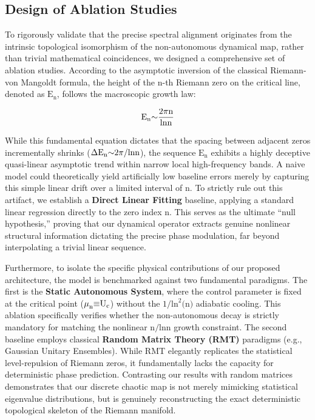 \documentclass[fleqn,10pt]{wlscirep}
\begin{document}
\subsection*{Design of Ablation Studies}

To rigorously validate that the precise spectral alignment originates
from the intrinsic topological isomorphism of the non-autonomous
dynamical map, rather than trivial mathematical coincidences, we
designed a comprehensive set of ablation studies. According to the
asymptotic inversion of the classical Riemann-von Mangoldt formula, the
height of the \(\text{n}\)-th Riemann zero on the critical line, denoted
as \(\text{E}_{\text{n}}\), follows the macroscopic growth law:

\[\text{E}_{\text{n}}\text{\ensuremath{\sim}}\frac{\text{2}\text{\ensuremath{\pi}n}}{\text{ln}\text{n}}\]

While this fundamental equation dictates that the spacing between
adjacent zeros incrementally shrinks
(\(\text{\ensuremath{\Delta}}\text{E}_{\text{n}}\text{\ensuremath{\sim}2}\text{\ensuremath{\pi}}\text{/ln}\text{n}\)),
the sequence \(\text{E}_{\text{n}}\) exhibits a highly deceptive
quasi-linear asymptotic trend within narrow local high-frequency bands.
A naive model could theoretically yield artificially low baseline errors
merely by capturing this simple linear drift over a limited interval of
\(\text{n}\). To strictly rule out this artifact, we establish a
\textbf{Direct Linear Fitting} baseline, applying a standard linear
regression directly to the zero index \(\text{n}\). This serves as the
ultimate ``null hypothesis,'' proving that our dynamical operator
extracts genuine nonlinear structural information dictating the precise
phase modulation, far beyond interpolating a trivial linear sequence.

Furthermore, to isolate the specific physical contributions of our
proposed architecture, the model is benchmarked against two fundamental
paradigms. The first is the \textbf{Static Autonomous System}, where the
control parameter is fixed at the critical point
(\(\text{\ensuremath{\mu}}_{\text{n}}\text{\ensuremath{\equiv}}\text{U}_{\text{c}}\)) without the
\(\text{1/}\text{ln}^{\text{2}}\text{(}\text{n}\text{)}\) adiabatic
cooling. This ablation specifically verifies whether the non-autonomous
decay is strictly mandatory for matching the nonlinear
\(\text{n}\text{/ln}\text{n}\) growth constraint. The second baseline
employs classical \textbf{Random Matrix Theory (RMT)} paradigms (e.g.,
Gaussian Unitary Ensembles). While RMT elegantly replicates the
statistical level-repulsion of Riemann zeros, it fundamentally lacks the
capacity for deterministic phase prediction. Contrasting our results
with random matrices demonstrates that our discrete chaotic map is not
merely mimicking statistical eigenvalue distributions, but is genuinely
reconstructing the exact deterministic topological skeleton of the
Riemann manifold.
\end{document}

